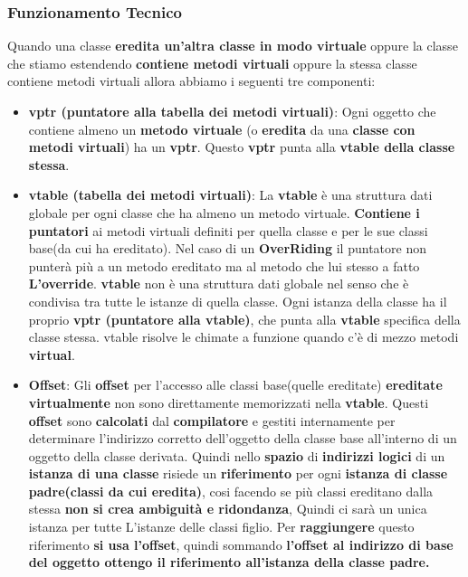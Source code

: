 \subsubsection{Funzionamento Tecnico}
Quando una classe \textbf{eredita un'altra classe in modo virtuale} oppure la classe che stiamo estendendo \textbf{contiene metodi virtuali} oppure la stessa classe contiene metodi virtuali allora abbiamo i seguenti tre componenti:
\begin{itemize}
    \item \textbf{vptr (puntatore alla tabella dei metodi virtuali)}: Ogni oggetto che contiene almeno un \textbf{metodo virtuale} (o \textbf{eredita} da una \textbf{classe con metodi virtuali}) ha un \textbf{vptr}. Questo \textbf{vptr} punta alla \textbf{vtable della classe stessa}.

    \item \textbf{vtable (tabella dei metodi virtuali)}: La \textbf{vtable} è una struttura dati globale per ogni classe che ha almeno un metodo virtuale. \textbf{Contiene i puntatori} ai metodi virtuali definiti per quella classe e per le sue classi base(da cui ha ereditato). Nel caso di un \textbf{OverRiding} il puntatore non punterà più a un metodo ereditato ma al metodo che lui stesso a fatto \textbf{L'override}. \textbf{vtable} non è una struttura dati globale nel senso che è condivisa tra tutte le istanze di quella classe. Ogni istanza della classe ha il proprio \textbf{vptr (puntatore alla vtable)}, che punta alla \textbf{vtable} specifica della classe stessa. vtable risolve le chimate a funzione quando c'è di mezzo metodi \textbf{virtual}.

    \item \textbf{Offset}: Gli \textbf{offset} per l'accesso alle classi base(quelle ereditate) \textbf{ereditate virtualmente} non sono direttamente memorizzati nella \textbf{vtable}. Questi \textbf{offset} sono \textbf{calcolati} dal \textbf{compilatore} e gestiti internamente per determinare l'indirizzo corretto dell'oggetto della classe base all'interno di un oggetto della classe derivata. Quindi nello \textbf{spazio} di \textbf{indirizzi logici} di un \textbf{istanza di una classe} risiede un \textbf{riferimento} per ogni \textbf{istanza di classe padre(classi da cui eredita)}, cosi facendo se più classi ereditano dalla stessa \textbf{non si crea ambiguità e ridondanza}, Quindi ci sarà un unica istanza per tutte L'istanze delle classi figlio. Per \textbf{raggiungere} questo riferimento \textbf{si usa l'offset}, quindi sommando \textbf{l'offset al indirizzo di base del oggetto ottengo il riferimento all'istanza della classe padre.}
\end{itemize}
\newpage

